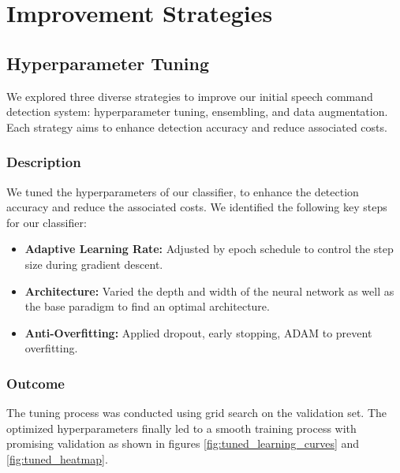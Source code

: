 \section{Improvement Strategies}
\subsection{Hyperparameter Tuning}
We explored three diverse strategies to improve our initial speech command detection system: hyperparameter tuning, ensembling, and data augmentation. Each strategy aims to enhance detection accuracy and reduce associated costs.
\subsubsection{Description}
We tuned the hyperparameters of our classifier, to enhance the detection accuracy and reduce the associated costs. We identified the following key steps for our classifier:
\begin{itemize}
  \item \textbf{Adaptive Learning Rate:} Adjusted by epoch schedule to control the step size during gradient descent.
  \item \textbf{Architecture:} Varied the depth and width of the neural network as well as the base paradigm to find an optimal architecture.
  \item \textbf{Anti-Overfitting:} Applied dropout, early stopping, ADAM to prevent overfitting.
\end{itemize}


\subsubsection{Outcome}
The tuning process was conducted using grid search on the validation set.
The optimized hyperparameters finally led to a smooth training process with promising validation as shown in figures
\ref{fig:tuned_learning_curves} and \ref{fig:tuned_heatmap}.

